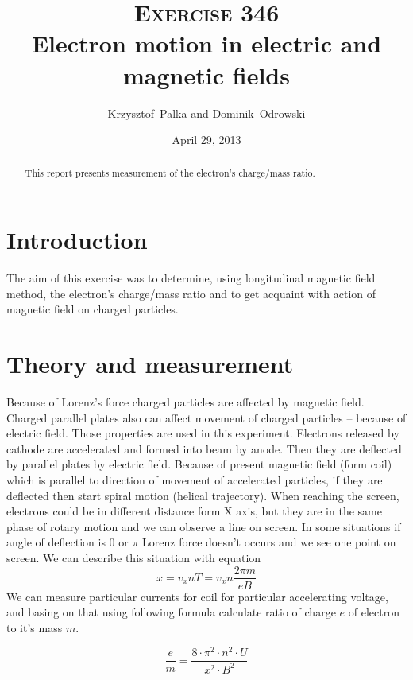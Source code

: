 \documentclass[a4paper,12pt]{article}
\author{Krzysztof~Palka and Dominik~Odrowski}
\date{April 29, 2013}
\title{\textsc{Exercise} 346 \\
Electron motion in electric and magnetic fields}
\begin{document}
    \maketitle

    \begin{abstract}
        This report presents measurement of the electron's charge/mass ratio.
    \end{abstract}

    \section{Introduction}
    The aim of this exercise was to determine, using longitudinal magnetic field method, the electron's charge/mass ratio and to get acquaint with action of magnetic field on charged particles. 

    \section{Theory and measurement}

    Because of Lorenz's force charged particles are affected by magnetic field. Charged parallel plates also can affect movement of charged particles -- because of electric field. Those properties are used in this experiment. Electrons released by cathode are accelerated and formed into beam by anode. Then they are deflected by parallel plates by electric field. Because of present magnetic field (form coil) which is parallel to direction of movement of accelerated particles, if they are deflected then start spiral motion (helical trajectory). When reaching the screen, electrons could be in different distance form X axis, but they are in the same phase of rotary motion and we can observe a line on screen. In some situations if angle of deflection is 0 or $\pi$ Lorenz force doesn't occurs and we see one point on screen.
    We can describe this situation with equation 
    \begin{equation}
        x = v_x nT = v_x n \frac{2 \pi m}{e B}
    \end{equation}
    We can measure particular currents for coil for particular accelerating voltage, and basing on that using following formula calculate ratio of charge $e$ of electron to it's mass $m$.    

    \begin{equation}
        \frac{e}{m} = \frac{8 \cdot \pi^2 \cdot n^2 \cdot U}{x^2 \cdot B^2} \label{eq:general}
    \end{equation}
    
\end{document}
